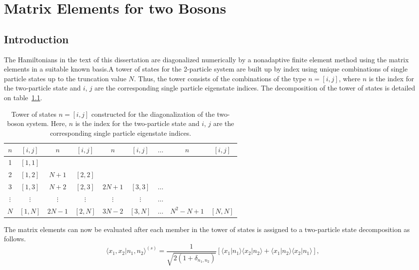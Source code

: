 \chapter{Matrix Elements for two Bosons}
%
\label{appendix-matelements}
\section{Introduction}
The Hamiltonians in the text of this dissertation are diagonalized numerically by a nonadaptive finite element method using the matrix elements in a suitable known basis.A tower of states for the 2-particle system are built up by index using unique combinations of single particle states up to the truncation value $N$. Thus, the tower consists of the combinations of the type $n=\left[i,j\right]$, where $n$ is the index for the two-particle state and $i$, $j$ are the corresponding single particle eigenstate indices. The decomposition of the tower of states is detailed on table~\ref{tabA:appendix}.

\begin{table}
\begin{center}
\begin{tabular}{|c|c|c|c|c|c|c|c|c|}
\hline
$n$ & $\left[i,j\right]$&	$n$&$\left[i,j\right]$&	$n$&$\left[i,j\right]$&	$\hdots$&	$n$&$\left[i,j\right]$\\
\hline
1&$\left[1,1\right]$&	&	&	&	&	&	&	\\
2&$\left[1,2\right]$&$N+1$&$\left[2,2\right]$&	&	&	&	&	\\
3&$\left[1,3\right]$&$N+2$&$\left[2,3\right]$&$2N+1$&$\left[3,3\right]$&$\hdots$&	&	\\
$\vdots$&$\vdots$&$\vdots$&$\vdots$& $\vdots$& $\vdots$&$\hdots$&	&	\\
$N$&$\left[1,N\right]$&$2N-1$&$\left[2,N\right]$&$3N-2$&$\left[3,N\right]$&$\hdots$& $N^2-N+1$& $\left[N,N\right]$\\
\hline
\end{tabular}
\caption{Tower of states $n=\left[i,j\right]$ constructed for the diagonalization of the two-boson system. Here, $n$ is the index for the two-particle state and $i$, $j$ are the corresponding single particle eigenstate indices.}
\label{tabA:appendix}
\end{center}
\end{table}
The matrix elements can now be evaluated after each member in the tower of states is assigned to a two-particle state decomposition as follows.
\begin{equation}
{\langle}x_1,x_2\vert n_1,n_2{\rangle} ^{(s)}=\frac{1}{\sqrt{2(1+\delta_{n_1,n_2})}} 
[{\langle}x_1|n_1\rangle{\langle}x_2|n_2\rangle +{\langle}x_1|n_2\rangle{\langle}x_2|n_1\rangle ],
\label{eq:symm:appendix}
\end{equation}

